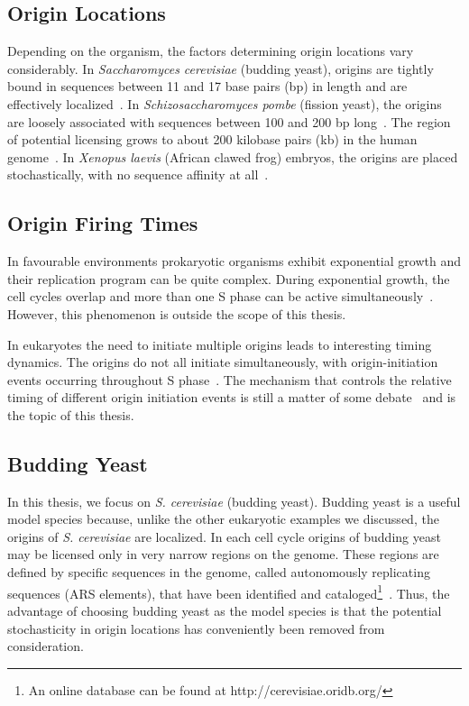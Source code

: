 	
		\subsection{Origin Locations}
		\label{subsec:OriginLocations}
		
		Depending on the organism, the factors determining origin locations vary considerably.
		In \emph{Saccharomyces cerevisiae} (budding yeast), origins are tightly bound in sequences between 11 and 17 base pairs (bp) in length and are effectively localized~\cite{ScottsPaper}.
		In \emph{Schizosaccharomyces pombe} (fission yeast), the origins are loosely associated with sequences between 100 and 200 bp long~\cite{OriginsReview}.
		The region of potential licensing grows to about 200 kilobase pairs (kb) in the human genome~\cite{HumanGenome}.
		In \emph{Xenopus laevis} (African clawed frog) embryos, the origins are placed stochastically, with no sequence affinity at all~\cite{FrogEmbryo}.
		
		
		\subsection{Origin Firing Times}
		\label{subsec:OriginTimes}
		
		In favourable environments prokaryotic organisms exhibit exponential growth and their replication program can be quite complex.
		During exponential growth, the cell cycles overlap and more than one S phase can be active simultaneously~\cite{ExponentialGrowth}.
		However, this phenomenon is outside the scope of this thesis.
		
		In eukaryotes the  need to initiate multiple origins leads to interesting timing dynamics.
		The origins do not all initiate simultaneously, with origin-initiation events occurring throughout S phase~\cite{DNAInitiation}.
		The mechanism that controls the relative timing of different origin initiation events is still a matter of some debate~\cite{ScottsPaper,Bechhoefer2012374,deMouraModel2,deMouraModel1} and is the topic of this thesis.
		
		
		\subsection{Budding Yeast}
		\label{subsec:BuddingYeast}
		
		In this thesis, we focus on \emph{S. cerevisiae} (budding yeast).
		Budding yeast is a useful model species because, unlike the other eukaryotic examples we discussed, the origins of \emph{S. cerevisiae} are localized.
		In each cell cycle origins of budding yeast may be licensed only in very narrow regions on the genome.
		These regions are defined by specific sequences in the genome, called autonomously replicating sequences (ARS elements), that have been identified and cataloged\footnote{An online database can be found at http://cerevisiae.oridb.org/}~\cite{OriDB}.
		Thus, the advantage of choosing budding yeast as the model species is that the potential stochasticity in origin locations has conveniently been removed from consideration.
		
